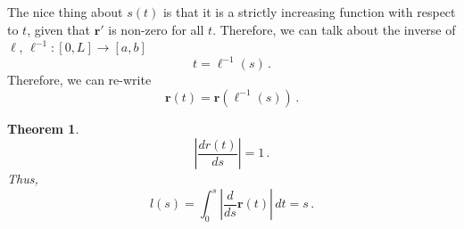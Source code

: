 \documentclass[
]{article}
\newtheorem{theorem}{Theorem}[section]
\theoremstyle{definition}
\theoremstyle{definition}
\theoremstyle{definition}
\theoremstyle{definition}
\theoremstyle{remark}
\begin{document}
The nice thing about \(s(t)\) is that it is a strictly increasing function with respect to \(t\),
given that \(\mathbf{r}'\) is non-zero for all \(t\).
Therefore, we can talk about the inverse of \(\ell\), \(\ell^{-1}:[0,L] \to [a,b]\)
\begin{equation*}
    t = \ell^{-1}(s) \,.
\end{equation*}
Therefore, we can re-write
\begin{equation*}
\mathbf{r}(t) = \mathbf{r}(\ell^{-1}(s)) \,.
\end{equation*}

\begin{theorem}
\[\left| \frac{d r(t)}{ds} \right| = 1 \,.\]
Thus,
\[l(s) = \int_0^s \left| \frac{d}{ds} \mathbf{r}(t) \right| \, dt = s \,.\]
\end{theorem}
\end{document}
